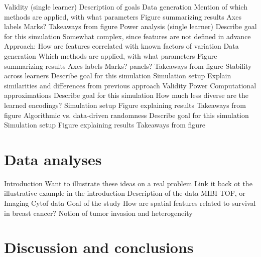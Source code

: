 \documentclass[11pt]{article}
\begin{document}
\begin{outline}
  \1 Validity (single learner)
    \2 Description of goals
    \2 Data generation
    \2 Mention of which methods are applied, with what parameters
    \2 Figure summarizing results
      \3 Axes labels
      \3 Marks?
    \2 Takeaways from figure
  \1 Power analysis (single learner)
    \2 Describe goal for this simulation
    \2 Somewhat complex, since features are not defined in advance
    \2 Approach: How are features correlated with known factors of variation
    \2 Data generation
    \2 Which methods are applied, with what parameters
    \2 Figure summarizing results
      \3 Axes labels
      \3 Marks?
      \3 panels?
    \2 Takeaways from figure
  \1 Stability across learners
    \2 Describe goal for this simulation
    \2 Simulation setup
      \3 Explain similarities and differences from previous approach
      \3 Validity
      \3 Power
  \1 Computational approximations
    \2 Describe goal for this simulation
    \2 How much less diverse are the learned encodings?
    \2 Simulation setup
    \2 Figure explaining results
    \2 Takeaways from figure
  \1 Algorithmic vs. data-driven randomness
    \2 Describe goal for this simulation
    \2 Simulation setup
    \2 Figure explaining results
    \2 Takeaways from figure
\end{outline}

\section{Data analyses}

\begin{outline}
  \1 Introduction
    \2 Want to illustrate these ideas on a real problem
      \3 Link it back ot the illustrative example in the introduction
    \2 Description of the data
      \3 MIBI-TOF, or Imaging Cytof data
  \1 Goal of the study
    \2 How are spatial features related to survival in breast cancer?
    \2 Notion of tumor invasion and heterogeneity
\end{outline}

\section{Discussion and conclusions}
\end{document}
